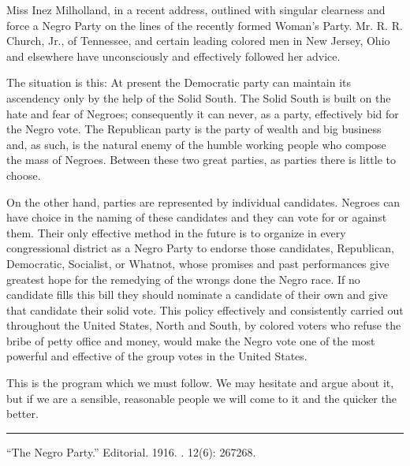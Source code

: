 \documentclass[letterpaper,10pt,english]{jupyterBook}
\begin{document}
\sphinxAtStartPar
Miss Inez Milholland, in a recent address, outlined with singular clearness and force a Negro Party on the lines of the recently formed Woman’s Party. Mr. R. R. Church, Jr., of Tennessee, and certain leading colored men in New Jersey, Ohio and elsewhere have unconsciously and effectively followed her advice.

\sphinxAtStartPar
The situation is this: At present the Democratic party can maintain its ascendency only by the help of the Solid South. The Solid South is built on the hate and fear of Negroes; consequently it can never, as a party, effectively bid for the Negro vote. The Republican party is the party of wealth and big business and, as such, is the natural enemy of the humble working people who compose the mass of Negroes. Between these two great parties, as parties there is little to choose.

\sphinxAtStartPar
On the other hand, parties are represented by individual candidates. Negroes can have choice in the naming of these candidates and they can vote for or against them. Their only effective method in the future is to organize in every congressional district as a Negro Party to endorse those candidates, Republican, Democratic, Socialist, or What\sphinxhyphen{}not, whose promises and past performances give greatest hope for the remedying of the wrongs done the Negro race. If no candidate fills this bill they should nominate a candidate of their own and give that candidate their solid vote. This policy effectively and consistently carried out throughout the United States, North and South, by colored voters who refuse the bribe of petty office and money, would make the Negro vote one of the most powerful and effective of the group votes in the United States.

\sphinxAtStartPar
This is the program which we must follow. We may hesitate and argue about it, but if we are a sensible, reasonable people we will come to it and the quicker the better.


\bigskip\hrule\bigskip


\sphinxAtStartPar
{} “The Negro Party.” Editorial. 1916. . 12(6): 267\sphinxhyphen{}268.
\end{document}
